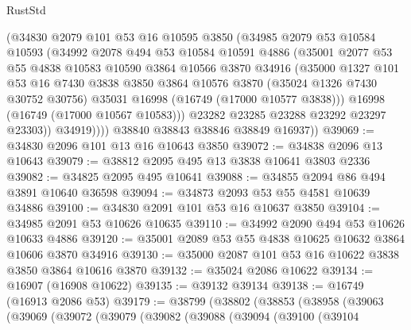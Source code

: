\begin{lexlean}{RustStd}
\begin{coremodule}
              (@34830
                @2079
                @101
                @53
                @16
                @10595
                @3850
                (@34985
                  @2079
                  @53
                  @10584
                  @10593
                  (@34992
                    @2078
                    @494
                    @53
                    @10584
                    @10591
                    @4886
                    (@35001
                      @2077
                      @53
                      @55
                      @4838
                      @10583
                      @10590
                      @3864
                      @10566
                      @3870
                      @34916
                      (@35000
                        @1327
                        @101
                        @53
                        @16
                        @7430
                        @3838
                        @3850
                        @3864
                        @10576
                        @3870
                        (@35024 @1326 @7430 @30752 @30756)
                        @35031
                        @16998
                        (@16749 (@17000 @10577 @3838)))
                      @16998
                      (@16749 (@17000 @10567 @10583)))
                    @23282
                    @23285
                    @23288
                    @23292
                    @23297
                    @23303))
                @34919))))
        @38840
        @38843
        @38846
        @38849
        @16937))
@39069 := @34830 @2096 @101 @13 @16 @10643 @3850
@39072 := @34838 @2096 @13 @10643
@39079 := @38812 @2095 @495 @13 @3838 @10641 @3803 @2336
@39082 := @34825 @2095 @495 @10641
@39088 := @34855 @2094 @86 @494 @3891 @10640 @36598
@39094 := @34873 @2093 @53 @55 @4581 @10639 @34886
@39100 := @34830 @2091 @101 @53 @16 @10637 @3850
@39104 := @34985 @2091 @53 @10626 @10635
@39110 := @34992 @2090 @494 @53 @10626 @10633 @4886
@39120 := @35001 @2089 @53 @55 @4838 @10625 @10632 @3864 @10606 @3870 @34916
@39130 := @35000 @2087 @101 @53 @16 @10622 @3838 @3850 @3864 @10616 @3870
@39132 := @35024 @2086 @10622
@39134 := @16907 (@16908 @10622)
@39135 := @39132 @39134
@39138 := @16749 (@16913 @2086 @53)
@39179 := @38799
    (@38802
      (@38853
        (@38958
          (@39063
            (@39069
              (@39072
                (@39079
                  (@39082
                    (@39088
                      (@39094
                        (@39100
                          (@39104

\end{coremodule}
\end{lexlean}

